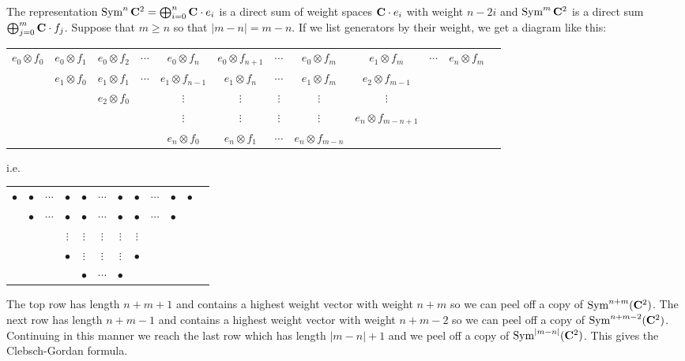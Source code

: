\documentclass[12pt]{article}
\begin{document}
\begin{answer}
The representation $\operatorname{Sym}^n\mathbf{C}^2=\bigoplus_{i=0}^n\mathbf{C}\cdot e_i$ is a direct sum of weight spaces $\mathbf{C}\cdot e_i$ with weight $n-2i$ and $\operatorname{Sym}^m\mathbf{C}^2$ is a direct sum $\bigoplus_{j=0}^m\mathbf{C}\cdot f_j$. Suppose that $m\geq n$ so that $|m-n|=m-n$. If we list generators by their weight, we get a diagram like this:

{\tiny
\begin{tabular}{cccccccccccc}
$e_0\otimes f_0$ & $e_0\otimes f_1$ & $e_0\otimes f_2$ & $\cdots$ & $e_0\otimes f_n$ & $e_0\otimes f_{n+1}$ & $\cdots$ & $e_0\otimes f_m$ & $e_1\otimes f_m$ & $\cdots$ & $e_n\otimes f_m$\\
& $e_1\otimes f_0$ & $e_1\otimes f_1$ & $\cdots$ & $e_1\otimes f_{n-1}$ & $e_1\otimes f_n$& $\cdots$ & $e_1\otimes f_m$ & $e_2\otimes f_{m-1}$ &  & \\
 & & $e_2\otimes f_0$ &  & $\vdots$&$\vdots$&$\vdots$&$\vdots$ & $\vdots$ & & &\\
 & & & & $\vdots$ & $\vdots$ & $\vdots$ & $\vdots$ &$e_n\otimes f_{m-n+1}$ & & &\\
&&&& $e_n\otimes f_0$ & $e_n\otimes f_1$ &$\cdots$& $e_n\otimes f_{m-n}$ & & & &
\end{tabular}
}

i.e.

\begin{center}{
\begin{tabular}{cccccccccccc}
$\bullet$ & $\bullet$ & $\cdots$ & $\bullet$ & $\bullet$ & $\cdots$ & $\bullet$ & $\bullet$ & $\cdots$ & $\bullet$ & $\bullet$\\
& $\bullet$ & $\cdots$ & $\bullet$ & $\bullet$ & $\cdots$ & $\bullet$ & $\bullet$ & $\cdots$  & $\bullet$ &\\
 & & & $\vdots$  & $\vdots$&$\vdots$&$\vdots$ & $\vdots$ & & &\\
 & & & $\bullet$ & $\vdots$ & $\vdots$ &$\vdots$ & $\bullet$ & &\\
&&& & $\bullet$ & $\cdots$& $\bullet$ & & & &
\end{tabular}
}\end{center}

The top row has length $n+m+1$ and contains a highest weight vector with weight $n+m$ so we can peel off a copy of $\operatorname{Sym}^{n+m}(\mathbf{C}^2)$. The next row has length $n+m-1$ and contains a highest weight vector with weight $n+m-2$ so we can peel off a copy of $\operatorname{Sym}^{n+m-2}(\mathbf{C}^2)$. Continuing in this manner we reach the last row which has length $|m-n|+1$ and we peel off a copy of $\operatorname{Sym}^{|m-n|}(\mathbf{C}^2)$. This gives the Clebsch-Gordan formula.
\end{answer}
\newpage
\end{document}
